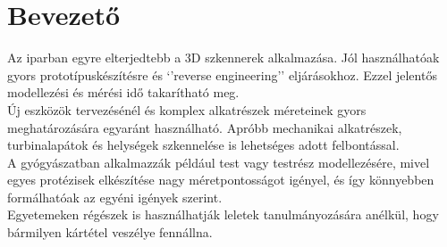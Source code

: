 \documentclass[12pt,a4paper]{article}
\begin{document}
\section{Bevezető}
Az iparban egyre elterjedtebb a 3D szkennerek alkalmazása. Jól használhatóak gyors prototípuskészítésre és `'reverse engineering'' eljárásokhoz. Ezzel jelentős modellezési és mérési idő takarítható meg.\\[10pt]
Új eszközök tervezésénél és komplex alkatrészek méreteinek gyors meghatározására egyaránt használható. Apróbb mechanikai alkatrészek, turbinalapátok és helységek szkennelése is lehetséges adott felbontással.\\[10pt]
A gyógyászatban alkalmazzák például test vagy testrész modellezésére, mivel egyes protézisek elkészítése nagy méretpontosságot igényel, és így könnyebben formálhatóak az egyéni igények szerint.\\[10pt]
Egyetemeken régészek is használhatják leletek tanulmányozására anélkül, hogy bármilyen kártétel veszélye fennállna.\\[10pt]
\end{document}
